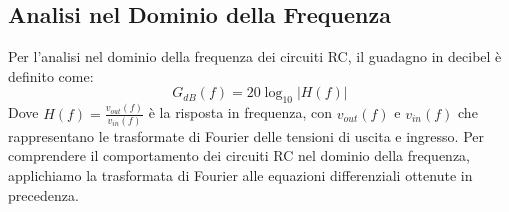 \documentclass[a4paper,12pt]{article}
\begin{document}



\subsection{Analisi nel Dominio della Frequenza}
Per l’analisi nel dominio della frequenza dei circuiti RC, il guadagno in decibel è definito come:
\begin{equation}
    \label{eq: Gdb}
    G_{dB}(f) = 20 \log_{10} \left| H(f) \right|
\end{equation}
Dove \( H(f) = \frac{v_{out}(f)}{v_{in}(f)} \) è la risposta in frequenza, con \( v_{out}(f) \) e \( v_{in}(f) \) che rappresentano le trasformate di Fourier delle tensioni di uscita e ingresso.
Per comprendere il comportamento dei circuiti RC nel dominio della frequenza, applichiamo la trasformata di Fourier alle equazioni differenziali ottenute in precedenza.
\end{document}
